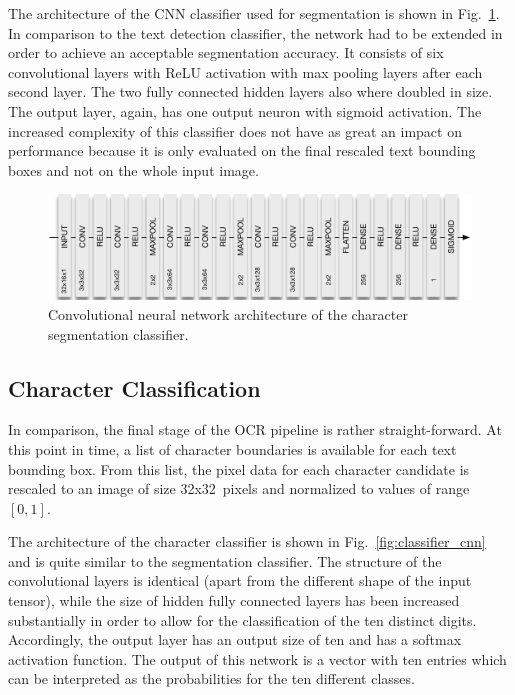\documentclass[12pt]{article}
\newcommand\figref[1]{Fig.~\ref{fig:#1}}
\begin{document}
The architecture of the CNN classifier used for segmentation is shown in \figref{segmentation_cnn}.
In comparison to the text detection classifier, the network had to be extended in order
to achieve an acceptable segmentation accuracy. It consists of six convolutional layers
with ReLU activation with max pooling layers after each second layer. The two fully connected
hidden layers also where doubled in size. The output layer, again, has one output neuron
with sigmoid activation. The increased complexity of this classifier does not have as
great an impact on performance because it is only evaluated on the final rescaled text bounding boxes
and not on the whole input image.

\begin{figure}[ht]
  \centering
  \includegraphics[scale=0.75]{fig/Segmentation_CNN}
  \caption
  {
    Convolutional neural network architecture of the character segmentation classifier.
  }
  \label{fig:segmentation_cnn}
\end{figure}



\subsection{Character Classification}
In comparison, the final stage of the OCR pipeline is rather straight-forward. At this point
in time, a list of character boundaries is available for each text bounding box. From this list,
the pixel data for each character candidate is rescaled to an image of size 32x32~pixels and
normalized to values of range $[0,1]$.

The architecture of the character classifier is shown in \figref{classifier_cnn} and is
quite similar to the segmentation classifier. The structure of the convolutional layers is
identical (apart from the different shape of the input tensor), while the size of hidden
fully connected layers has been increased substantially in order to allow for the
classification of the ten distinct digits. Accordingly, the output layer has an output size
of ten and has a softmax activation function. The output of this network is a vector
with ten entries which can be interpreted as the probabilities for the ten different classes.
\end{document}
